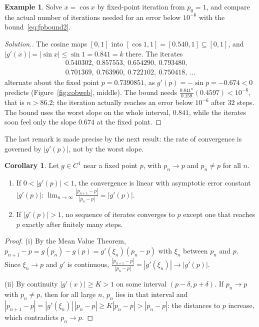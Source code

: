 \documentclass[11pt,a4paper]{article}
\numberwithin{equation}{section}
\theoremstyle{definition}
\newtheorem{exa}[thm]{Example}
\newtheorem{coro}[thm]{Corollary}
\newenvironment{solution}
  {\renewcommand{\qedsymbol}{}\begin{proof}[\textit{Solution}.]}
  {\end{proof}}
\begin{document}
\begin{exa}
\label{exa:cosfp}
Solve $x = \cos x$ by fixed-point iteration from $p_0 = 1$, and compare the actual number of iterations needed for an error below $10^{-6}$
with the bound~\eqref{eq:fpbound2}.
\end{exa}

\begin{solution}
The cosine maps $[0,1]$ into $[\cos1,1] = [0.540,1]\subseteq[0,1]$, and $|g'(x)| = |\sin x|\leq\sin1 = 0.841 = k$ there. The iterates
\begin{gather*}
0.540302,\ 0.857553,\ 0.654290,\ 0.793480,\\
0.701369,\ 0.763960,\ 0.722102,\ 0.750418,\ \dots
\end{gather*}
alternate about the fixed point $p = 0.7390851$, as $g'(p) = -\sin p = -0.674<0$ predicts (Figure~\ref{fig:cobweb}, middle). The bound
needs $\frac{0.841^n}{0.159}(0.4597)<10^{-6}$, that is $n>86.2$; the iteration actually reaches an error below $10^{-6}$ after $32$ steps.
The bound uses the worst slope on the whole interval, $0.841$, while the iterates soon feel only the slope $0.674$ at the fixed point.
\end{solution}

The last remark is made precise by the next result: the rate of convergence is governed by $|g'(p)|$, not by the worst slope.

\begin{coro}
\label{coro:fprate}
Let $g\in C^1$ near a fixed point $p$, with $p_n\longrightarrow p$ and $p_n\neq p$ for all $n$.
\begin{enumerate}
\item[(i)] If $0<|g'(p)|<1$, the convergence is linear with asymptotic error constant $|g'(p)|$:
$\displaystyle\lim_{n\rightarrow\infty}\frac{|p_{n+1}-p|}{|p_n-p|} = |g'(p)|$.
\item[(ii)] If $|g'(p)|>1$, no sequence of iterates converges to $p$ except one that reaches $p$ exactly after finitely many steps.
\end{enumerate}
\end{coro}

\begin{proof}
(i) By the Mean Value Theorem, $p_{n+1}-p = g(p_n)-g(p) = g'(\xi_n)(p_n-p)$ with $\xi_n$ between $p_n$ and $p$. Since $\xi_n\longrightarrow p$
and $g'$ is continuous, $\frac{|p_{n+1}-p|}{|p_n-p|} = |g'(\xi_n)|\longrightarrow|g'(p)|$.

(ii) By continuity $|g'(x)|\geq K>1$ on some interval $(p-\delta,p+\delta)$. If $p_n\longrightarrow p$ with $p_n\neq p$, then for all large $n$,
$p_n$ lies in that interval and $|p_{n+1}-p| = |g'(\xi_n)|\,|p_n-p|\geq K|p_n-p|>|p_n-p|$: the distances to $p$ increase, which
contradicts $p_n\longrightarrow p$.
\end{proof}
\end{document}
